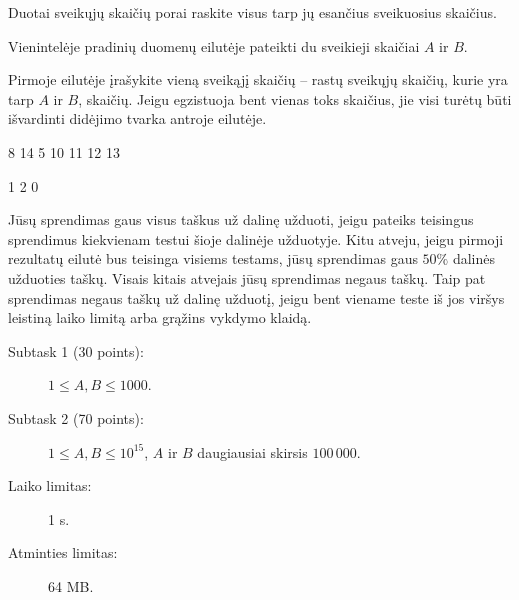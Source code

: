\documentclass{boi2014-lt}
\begin{document}
    Duotai sveikųjų skaičių porai raskite visus tarp jų esančius sveikuosius
    skaičius.

    \Input
    Vienintelėje pradinių duomenų eilutėje pateikti du sveikieji skaičiai
    $A$ ir $B$.

    \Output
    Pirmoje eilutėje įrašykite vieną sveikąjį skaičių -- rastų sveikųjų skaičių,
    kurie yra tarp $A$ ir $B$, skaičių. Jeigu egzistuoja bent vienas toks
    skaičius, jie visi turėtų būti išvardinti didėjimo tvarka antroje eilutėje.
    
    \Examples

    \simpleexample
    {
        8 14
    }
    {
        5  10 11 12 13
    }

    \simpleexample
    {
        1 2
    }
    {
        0
    }

    \Scoring
    Jūsų sprendimas gaus visus taškus už dalinę užduoti, jeigu pateiks teisingus
    sprendimus kiekvienam testui šioje dalinėje užduotyje. Kitu atveju, jeigu
    pirmoji rezultatų eilutė bus teisinga visiems testams, jūsų sprendimas gaus
    $50\%$ dalinės užduoties taškų. Visais kitais atvejais jūsų sprendimas negaus
    taškų. Taip pat sprendimas negaus taškų už dalinę užduotį, jeigu bent viename
    teste iš jos viršys leistiną laiko limitą arba grąžins vykdymo klaidą.

    \begin{description}

        \item[Subtask 1 (30 points):] $1 \le A, B \le 1000$. 
        \item[Subtask 2 (70 points):] $1 \le A, B \le 10^{15}$,
            $A$ ir $B$ daugiausiai skirsis $100\,000$.
    \end{description}

    \Constraints

    \begin{description}
        \item[Laiko limitas:] 1 s.
        \item[Atminties limitas:] 64 MB.
    \end{description}
\end{document}
